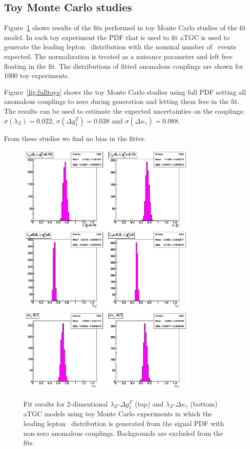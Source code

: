 \subsection{Toy Monte Carlo studies}
Figure~\ref{fig:toys} shows results of the fits
performed in toy Monte Carlo studies of the fit model. In each toy
experiment the PDF that is used to fit aTGC is used to generate the
leading lepton \pt\ distribution with the nominal number of \WW\
events expected. The normalization is treated as a nuisance parameter
and left free floating in the fit. The distributions of fitted
anomalous couplings are shown for 1000 toy experiments.

Figure~\ref{fig:fulltoys} shows the toy Monte Carlo studies using full
PDF setting all anomalous couplings to zero during generation and
letting them free in the fit. The results can be used to estimate the
expected uncertainties on the couplings: $\sigma(\lambda_{Z})=0.022$,
$\sigma(\Delta g^Z_1)=0.038$ and $\sigma(\Delta\kappa_\gamma)=0.088$.

From these studies we find no bias in the fitter. 

\begin{figure}[tp]
  \centering
    \includegraphics[width=0.8\textwidth]{figures/fit_wwATGC_toymc_1D_abs}
    \includegraphics[width=0.8\textwidth]{figures/fit_wwATGC_toymc_1D_abs2}

  \caption[Toy Monte Carlo studies] {Fit results for 2-dimentional
  $\lambda_{Z}$-$\Delta g^Z_1$ (top) and
  $\lambda_{Z}$-$\Delta\kappa_\gamma$ (bottom) aTGC models using toy
  Monte Carlo experiments in which the leading lepton \pt\
  distribution is generated from the signal PDF with non-zero
  anomalous couplings. Backgrounds are excluded from the fits.}

\label{fig:toys}
\end{figure}

